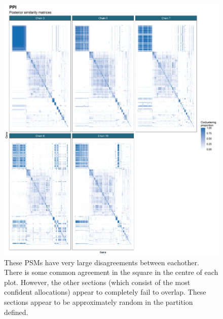 \documentclass[]{article}
\begin{document}
\begin{figure}
	\centering
	\includegraphics[scale=0.5]{../Images/Yeast/PPIPSMcomparisonReduced.png}
	\caption{These PSMs have very large disagreements between eachother. There is some common agreement in the square in the centre of each plot. However, the other sections (which consist of the most confident allocations) appear to completely fail to overlap. These sections appear to be approximately random in the partition defined.}
	\label{fig:ppiPSMs}
\end{figure}
\end{document}

